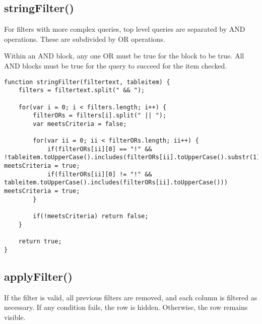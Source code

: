 \documentclass[letterpaper]{article}
\begin{document}
\subsection{stringFilter()}

For filters with more complex queries, top level queries are separated by AND operations.
These are subdivided by OR operations.

Within an AND block, any one OR must be true for the block to be true.
All AND blocks must be true for the query to succeed for the item checked.

\begin{lstlisting}[firstnumber=494]
function stringFilter(filtertext, tableitem) {
    filters = filtertext.split(" && ");

    for(var i = 0; i < filters.length; i++) {
        filterORs = filters[i].split(" || ");
        var meetsCriteria = false;

        for(var ii = 0; ii < filterORs.length; ii++) {
            if(filterORs[ii][0] == "!" && !tableitem.toUpperCase().includes(filterORs[ii].toUpperCase().substr(1))) meetsCriteria = true;
            if(filterORs[ii][0] != "!" && tableitem.toUpperCase().includes(filterORs[ii].toUpperCase())) meetsCriteria = true;
        }

        if(!meetsCriteria) return false;
    }

    return true;
}
\end{lstlisting}

\subsection{applyFilter()}

If the filter is valid, all previous filters are removed, and each column is filtered as necessary.
If any condition fails, the row is hidden.
Otherwise, the row remains visible.
\end{document}
